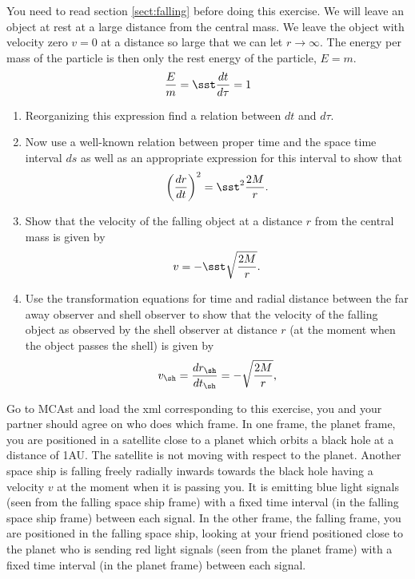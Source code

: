 {\begin{multicols}{2}
\begin{enumerate}
\end{enumerate}

\vspace{2cm}



You need to read section \ref{sect:falling} before doing this exercise. We will leave an object at rest at a large distance from the central mass. We leave the object with velocity zero $v=0$ at a distance so large that we can let $r\rightarrow\infty$. The energy per mass of the particle is then only the rest energy of the particle, $E=m$.
\[
\frac{E}{m}=\sst\frac{dt}{d\tau}=1
\]
\begin{enumerate}
\item Reorganizing this expression find a relation between $dt$ and $d\tau$.
\item Now use a well-known relation between proper time and the space time interval $ds$ as well as an appropriate expression for this interval to show that
\[
\left(\frac{dr}{dt}\right)^2=\sst^2\frac{2M}{r}.
\]
\item Show that the velocity of the falling object at a distance $r$ from the central mass is given by
\[
v=-\sst\sqrt{\frac{2M}{r}}.
\]
\item Use the transformation equations for time and radial distance between the far away observer and shell observer to show that the velocity of the falling object as observed by the shell observer at distance $r$ (at the moment when the object passes the shell) is given by
\[
v_\sh=\frac{dr_\sh}{dt_\sh}=-\sqrt{\frac{2M}{r}},
\]
\end{enumerate}



Go to MCAst and load the xml corresponding to this exercise, you and your partner should agree on who does which frame.
In one frame, the planet frame,  you are positioned in a satellite close to a planet which orbits a black hole at a distance of 1AU. The satellite is not moving with respect to the planet. Another space ship is falling freely radially inwards towards the black hole having a velocity $v$ at the moment when it is passing you. It is emitting blue light signals (seen from the falling space ship frame) with a fixed time interval (in the falling space ship frame) between each signal. In the other frame, the falling frame, you are positioned in the falling space ship, looking at your friend positioned close to the planet who is sending red light signals (seen from the planet frame) with a fixed time interval (in the planet frame) between each signal.


\end{multicols}}
